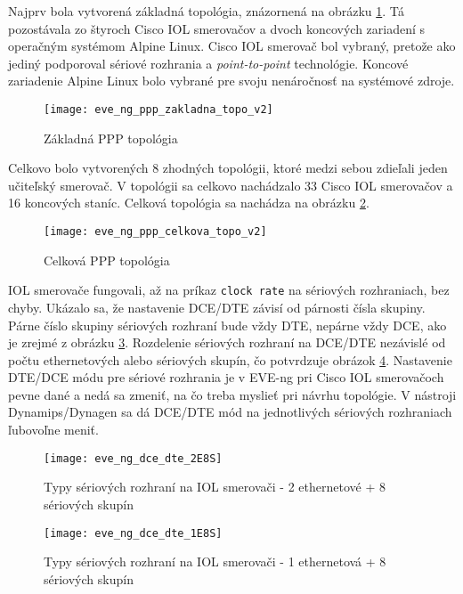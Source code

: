 Najprv bola vytvorená základná topológia, znázornená na obrázku \ref{obr:eve_ng_ppp_zakladna_topo_v2}. Tá pozostávala zo štyroch Cisco IOL smerovačov a dvoch koncových zariadení s operačným systémom Alpine Linux. Cisco IOL smerovač bol vybraný, pretože ako jediný podporoval sériové rozhrania a \emph{point-to-point} technológie. Koncové zariadenie Alpine Linux bolo vybrané pre svoju nenáročnosť na systémové zdroje.

\begin{figure}
    \centering
    \texttt{[image: eve\_ng\_ppp\_zakladna\_topo\_v2]}
    \caption{Základná PPP topológia}
    \label{obr:eve_ng_ppp_zakladna_topo_v2}
\end{figure}

Celkovo bolo vytvorených 8 zhodných topológii, ktoré medzi sebou zdieľali jeden učiteľský smerovač. V topológii sa celkovo nachádzalo 33 Cisco IOL smerovačov a 16 koncových staníc. Celková topológia sa nachádza na obrázku \ref{obr:eve_ng_ppp_celkova_topo_v2}.

\begin{figure}
    \centering
    \texttt{[image: eve\_ng\_ppp\_celkova\_topo\_v2]}
    \caption{Celková PPP topológia}
    \label{obr:eve_ng_ppp_celkova_topo_v2}
\end{figure}

IOL smerovače fungovali, až na príkaz \texttt{clock rate} na sériových rozhraniach, bez chyby. Ukázalo sa, že nastavenie DCE/DTE závisí od párnosti čísla skupiny. Párne číslo skupiny sériových rozhraní bude vždy DTE, nepárne vždy DCE, ako je zrejmé z obrázku \ref{obr:eve_ng_dce_dte_2E8S}. Rozdelenie sériových rozhraní na DCE/DTE nezávislé od počtu ethernetových alebo sériových skupín, čo potvrdzuje obrázok \ref{obr:eve_ng_dce_dte_1E8S}. Nastavenie DTE/DCE módu pre sériové rozhrania je v EVE-ng pri Cisco IOL smerovačoch pevne dané a nedá sa zmeniť, na čo treba myslieť pri návrhu topológie. V nástroji Dynamips/Dynagen sa dá DCE/DTE mód na jednotlivých sériových rozhraniach ľubovoľne meniť.

\begin{figure}
    \centering
    \texttt{[image: eve\_ng\_dce\_dte\_2E8S]}
    \caption{Typy sériových rozhraní na IOL smerovači - 2 ethernetové + 8 sériových skupín}
    \label{obr:eve_ng_dce_dte_2E8S}
\end{figure}

\begin{figure}
    \centering
    \texttt{[image: eve\_ng\_dce\_dte\_1E8S]}
    \caption{Typy sériových rozhraní na IOL smerovači - 1 ethernetová + 8 sériových skupín}
    \label{obr:eve_ng_dce_dte_1E8S}
\end{figure}

